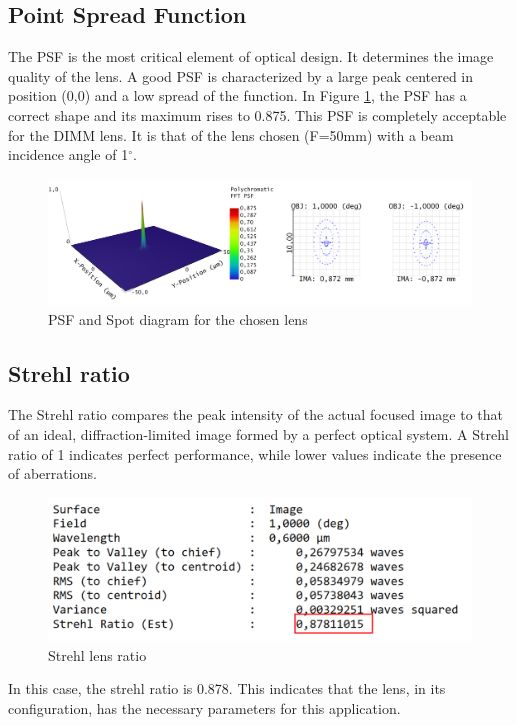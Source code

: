 \subsection{Point Spread Function}
The \gls{PSF} is the most critical element of optical design. It determines the image quality of the lens.
A good \gls{PSF} is characterized by a large peak centered in position (0,0) and a low spread of the function.
\newline
In Figure \ref{fig:Opti_ZemaxPSF}, the \gls{PSF} has a correct shape and its maximum rises to 0.875. This \gls{PSF} is completely acceptable
for the \Gls{DIMM} lens. It is that of the lens chosen (F=50mm) with a beam incidence angle of 1$^{\circ}$.
\begin{figure}[H]
    \centering
    \includegraphics[scale=0.5]{assets/figures/Optical Design/Zemax_PSF.png}
    \caption{PSF and Spot diagram for the chosen lens}
    \label{fig:Opti_ZemaxPSF}
\end{figure}
\subsection{Strehl ratio}
The Strehl ratio compares the peak intensity of the actual focused image to that of an ideal,
diffraction-limited image formed by a perfect optical system. A Strehl ratio of 1 indicates perfect performance,
while lower values indicate the presence of aberrations.
\begin{figure}[H]
    \centering
    \includegraphics[scale=0.8]{assets/figures/Optical Design/Zemax_Strehl.png}
    \caption{Strehl lens ratio}
    \label{fig:Opti_ZemaxStrehl}
\end{figure}
In this case, the strehl ratio is 0.878. This indicates that the lens, in its configuration,
has the necessary parameters for this application.
\newpage
